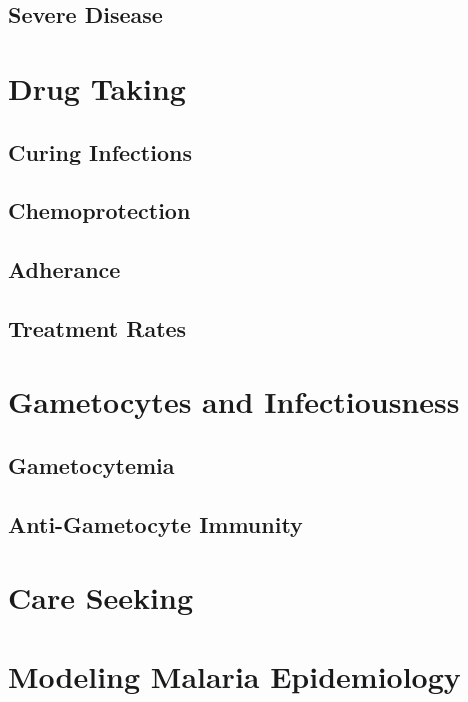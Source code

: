 \documentclass[
]{book}
\begin{document}
\section{Severe Disease}\label{severe-disease}

\chapter{Drug Taking}\label{drug-taking}

\section{Curing Infections}\label{curing-infections}

\section{Chemoprotection}\label{chemoprotection}

\section{Adherance}\label{adherance}

\section{Treatment Rates}\label{treatment-rates}

\chapter{Gametocytes and Infectiousness}\label{gametocytes-and-infectiousness-1}

\section{Gametocytemia}\label{gametocytemia}

\section{Anti-Gametocyte Immunity}\label{anti-gametocyte-immunity}

\chapter{Care Seeking}\label{care-seeking}

\chapter{Modeling Malaria Epidemiology}\label{modeling-malaria-epidemiology}
\end{document}
